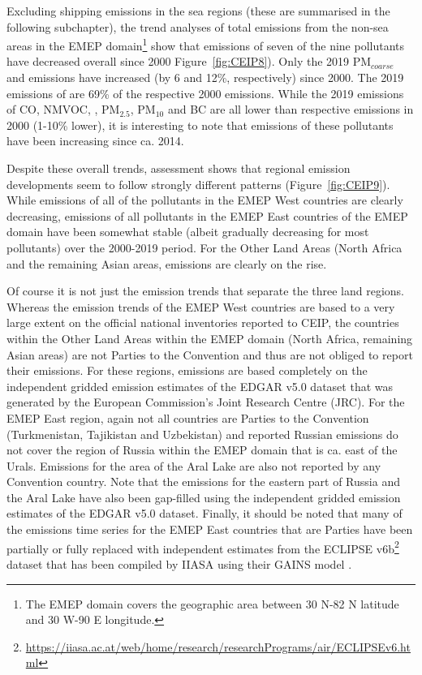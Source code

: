 Excluding shipping emissions in the sea regions (these are summarised in the following subchapter), the trend analyses of total emissions from the non-sea areas in the EMEP domain\footnote{The EMEP domain covers the geographic area between 30{\degrees} N-82{\degrees} N latitude and 30{\degrees} 
  W-90{\degrees} E longitude.} show that emissions of seven of the nine pollutants have decreased overall since 2000 Figure~\ref{fig:CEIP8}). Only the 2019 PM$_{coarse}$  and \nhiii emissions have increased (by 6 and 12\%, respectively) since 2000. The 2019 emissions of \sox are 69\% of the respective 2000 emissions. While the 2019 emissions of CO, NMVOC, \nox, PM$_{2.5}$, PM$_{10}$ and BC are all lower than respective emissions in 2000 (1-10\% lower), it is interesting to note that emissions of these pollutants have been increasing since ca. 2014.

Despite these overall trends, assessment shows that regional emission developments seem to follow strongly different patterns (Figure~\ref{fig:CEIP9}). While emissions of all of the pollutants in the EMEP West countries are clearly decreasing, emissions of all pollutants in the EMEP East countries of the EMEP domain have been somewhat stable (albeit gradually decreasing for most pollutants) over the 2000-2019 period. For the Other Land Areas (North Africa and the remaining Asian areas, emissions are clearly on the rise.

Of course it is not just the emission trends that separate the three land regions. Whereas the emission trends of the EMEP West countries are based to a very large extent on the official national inventories reported to CEIP, the countries within the Other Land Areas within the EMEP domain (North Africa, remaining Asian areas) are not Parties to the Convention and thus are not obliged to report their emissions. For these regions, emissions are based completely on the independent gridded emission estimates of the EDGAR v5.0 dataset \citep{EDGARv50} that was generated by the European Commission's Joint Research Centre (JRC). For the EMEP East region, again not all countries are Parties to the Convention (Turkmenistan, Tajikistan and Uzbekistan) and reported Russian emissions do not cover the region of Russia within the EMEP domain that is ca. east of the Urals. Emissions for the area of the Aral Lake are also not reported by any Convention country. Note that the emissions for the eastern part of Russia and the Aral Lake have also been gap-filled using the independent gridded emission estimates of the EDGAR v5.0 dataset. Finally, it should be noted that many of the emissions time series for the EMEP East countries that are Parties have been partially or fully replaced with independent estimates from the ECLIPSE v6b\footnote{\url{https://iiasa.ac.at/web/home/research/researchPrograms/air/ECLIPSEv6.html}} dataset that has been compiled by IIASA using their GAINS model  \citep{Amann_et_al:2011}.


